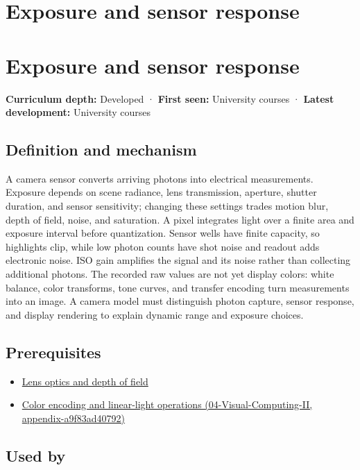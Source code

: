 \hypertarget{appendix-92d45cdf2afc}{}
\section*{Exposure and sensor response}
\section{Exposure and sensor response}\label{exposure-and-sensor-response}

\textbf{Curriculum depth:} Developed · \textbf{First seen:} University courses · \textbf{Latest development:} University courses

\subsection{Definition and mechanism}\label{definition-and-mechanism}

A camera sensor converts arriving photons into electrical measurements. Exposure depends on scene radiance, lens transmission, aperture, shutter duration, and sensor sensitivity; changing these settings trades motion blur, depth of field, noise, and saturation. A pixel integrates light over a finite area and exposure interval before quantization. Sensor wells have finite capacity, so highlights clip, while low photon counts have shot noise and readout adds electronic noise. ISO gain amplifies the signal and its noise rather than collecting additional photons. The recorded raw values are not yet display colors: white balance, color transforms, tone curves, and transfer encoding turn measurements into an image. A camera model must distinguish photon capture, sensor response, and display rendering to explain dynamic range and exposure choices.

\subsection{Prerequisites}\label{prerequisites}

\begin{itemize}
\tightlist
\item
  \hyperref[appendix-21f8456e2629]{Lens optics and depth of field}
\item
  \href{}{Color encoding and linear-light operations (04-Visual-Computing-II, appendix-a9f83ad40792)}
\end{itemize}

\subsection{Used by}\label{used-by}


